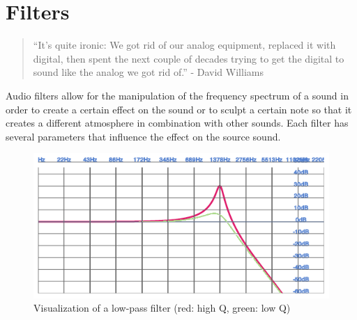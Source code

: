 \section{Filters}
\label{sec:webaudio-filter}

\begin{quote}
  ``It's quite ironic: We got rid of our analog equipment, replaced it with digital, then spent the next couple of decades trying to get the digital to sound like the analog we got rid of.'' -
  David Williams
\end{quote}

Audio filters allow for the manipulation of the frequency spectrum of a sound in order to create a certain effect on the sound or to sculpt a certain note so that it creates a different atmosphere in combination with other sounds. Each filter has several parameters that influence the effect on the source sound.

\begin{figure}[htb]
  \centerline{\includegraphics[width=0.9\linewidth]{images/filter-demonstration.png}}
  \caption[Visualization of a low-pass filter -
  \protect{}
  \protect{}]{Visualization of a low-pass filter (red: high Q, green: low Q)}
  \label{fig:filters-visualization}
\end{figure}

